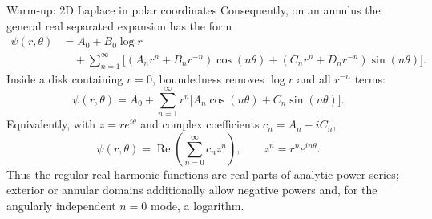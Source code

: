 \documentclass[11pt]{beamer}
\begin{document}
\begin{frame}[allowframebreaks]{Warm-up: 2D Laplace in polar coordinates}
Consequently, on an annulus the general real separated expansion has the form
\begin{align*}
  \psi(r,\theta)
  &=A_0+B_0\log r \\
  &\quad+\sum_{n=1}^{\infty}
     \Big[(A_nr^n+B_nr^{-n})\cos(n\theta)
          +(C_nr^n+D_nr^{-n})\sin(n\theta)\Big].
\end{align*}
Inside a disk containing $r=0$, boundedness removes $\log r$ and all $r^{-n}$ terms:
\begin{equation}
  \psi(r,\theta)
   =A_0+\sum_{n=1}^{\infty}r^n
       \bigl[A_n\cos(n\theta)+C_n\sin(n\theta)\bigr].
  \label{eq:laplace2d-sol}
\end{equation}
Equivalently, with $z=re^{i\theta}$ and complex coefficients $c_n=A_n-iC_n$,
\[
  \psi(r,\theta)=\operatorname{Re}\!\left(\sum_{n=0}^{\infty}c_nz^n\right),
  \qquad z^n=r^ne^{in\theta}.
\]
Thus the regular real harmonic functions are real parts of analytic power series; exterior
or annular domains additionally allow negative powers and, for the angularly independent
$n=0$ mode, a logarithm.
\end{frame}
\end{document}
